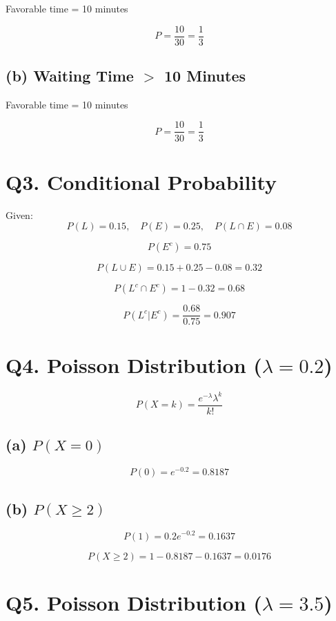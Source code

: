 \documentclass[12pt]{article}
\begin{document}
Favorable time = 10 minutes

\[
P = \frac{10}{30} = \frac{1}{3}
\]

\subsection*{(b) Waiting Time $>$ 10 Minutes}

Favorable time = 10 minutes

\[
P = \frac{10}{30} = \frac{1}{3}
\]

\section*{Q3. Conditional Probability}

Given:
\[
P(L)=0.15,\quad P(E)=0.25,\quad P(L\cap E)=0.08
\]

\[
P(E^c)=0.75
\]

\[
P(L\cup E)=0.15+0.25-0.08=0.32
\]

\[
P(L^c \cap E^c)=1-0.32=0.68
\]

\[
P(L^c|E^c)=\frac{0.68}{0.75}=0.907
\]

\section*{Q4. Poisson Distribution ($\lambda=0.2$)}

\[
P(X=k)=\frac{e^{-\lambda}\lambda^k}{k!}
\]

\subsection*{(a) $P(X=0)$}

\[
P(0)=e^{-0.2}=0.8187
\]

\subsection*{(b) $P(X\ge 2)$}

\[
P(1)=0.2e^{-0.2}=0.1637
\]

\[
P(X\ge 2)=1-0.8187-0.1637=0.0176
\]

\section*{Q5. Poisson Distribution ($\lambda=3.5$)}
\end{document}
